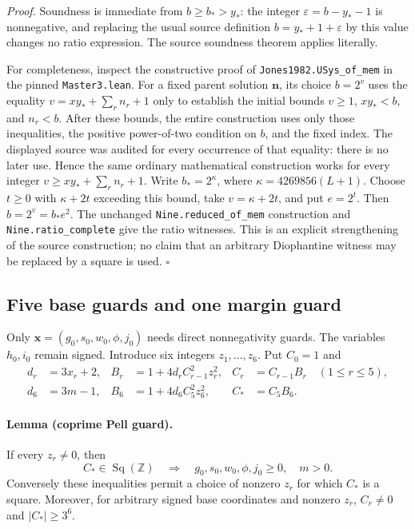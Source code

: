 \emph{Proof.}
Soundness is immediate from \(b\ge b_*>y_*\): the integer
\(\varepsilon=b-y_*-1\) is nonnegative, and replacing the usual source
definition \(b=y_*+1+\varepsilon\) by this value changes no ratio
expression.  The source soundness theorem applies literally.

For completeness, inspect the constructive proof of
\texttt{Jones1982.USys\_of\_mem} in the pinned
\texttt{Master3.lean}.  For a fixed parent solution \(\mathbf n\),
its choice \(b=2^v\) uses the equality
\(v=x y_*+\sum_r n_r+1\) only to establish the initial bounds
\(v\ge1\), \(x y_*<b\), and \(n_r<b\).
After these bounds, the entire construction uses only those inequalities,
the positive power-of-two condition on \(b\), and the fixed index.
The displayed source was audited for every occurrence of that equality:
there is no later use.  Hence the same ordinary mathematical construction
works for every integer
\(v\ge x y_*+\sum_r n_r+1\).
Write \(b_*=2^\kappa\), where \(\kappa=4269856(L+1)\).
Choose \(t\ge0\) with \(\kappa+2t\) exceeding this bound, take
\(v=\kappa+2t\), and put \(e=2^t\).
Then \(b=2^v=b_*e^2\).  The unchanged
\texttt{Nine.reduced\_of\_mem} construction and
\texttt{Nine.ratio\_complete} give the ratio witnesses.
This is an explicit strengthening of the source construction; no
claim that an arbitrary Diophantine witness may be replaced by a square
is used. \hfill\(\square\)

\subsection{Five base guards and one margin guard}

Only \(\mathbf x=(g_0,s_0,w_0,\phi,j_0)\) needs direct
nonnegativity guards.  The variables \(h_0,i_0\) remain signed.
Introduce six integers \(z_1,\ldots,z_6\).  Put \(C_0=1\) and
\begin{align*}
 d_r&=3x_r+2,& B_r&=1+4d_r C_{r-1}^2z_r^2,&
 C_r&=C_{r-1}B_r\quad(1\le r\le5),\\
 d_6&=3m-1,&B_6&=1+4d_6 C_5^2z_6^2,&C_*&=C_5B_6.
\end{align*}

\paragraph{Lemma (coprime Pell guard).}
If every \(z_r\ne0\), then
\[
 C_*\in\operatorname{Sq}(\mathbb Z)
 \quad\Longrightarrow\quad
 g_0,s_0,w_0,\phi,j_0\ge0,\quad m>0.
\]
Conversely these inequalities permit a choice of nonzero \(z_r\)
for which \(C_*\) is a square.  Moreover, for arbitrary signed
base coordinates and nonzero \(z_r\),
\(C_r\ne0\) and \(|C_*|\ge3^6\).

